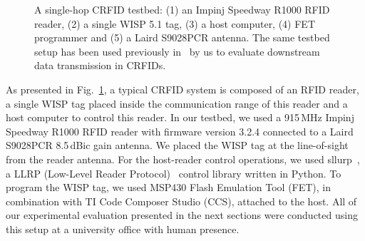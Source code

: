 \documentclass[journal,draftcls,onecolumn,12pt,twoside]{IEEEtranTCOM}
\begin{document}
\begin{figure}
\centering
\caption{\label{fig:crfid_testbed} A single-hop CRFID testbed: (1) an Impinj Speedway R1000 RFID reader, (2) a single WISP 5.1 tag, (3) a host computer, (4) FET programmer and (5) a Laird S9028PCR antenna. The same testbed setup has been used previously in~\cite{wisent:2016} by us to evaluate downstream data transmission in CRFIDs.}
\end{figure}

As presented in Fig.~\ref{fig:crfid_testbed}, a typical CRFID system is composed of an RFID reader, a single WISP tag placed inside the communication range of this reader and a host computer to control this reader. In our testbed, we used a 915\,MHz Impinj Speedway R1000 RFID reader with firmware version 3.2.4 connected to a Laird S9028PCR 8.5\,dBic gain antenna. We placed the WISP tag at the line-of-sight from the reader antenna. For the host-reader control operations, we used sllurp~\cite{sllrp_github}, a LLRP (Low-Level Reader Protocol)~\cite{llrp}  control library written in Python.  To program the WISP tag, we used MSP430 Flash Emulation Tool (FET), in combination with TI Code Composer Studio (CCS), attached to the host.  All of our experimental evaluation presented in the next sections were conducted using this setup at a university office with human presence.
 
\end{document}

